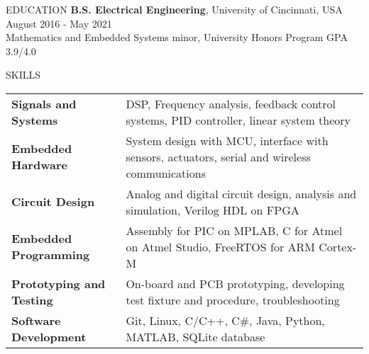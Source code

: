 \documentclass{../lib/resume} %
\begin{document}

\begin{rSection}{EDUCATION}
    {\bf B.S. Electrical Engineering}, University of Cincinnati, USA \hfill {August 2016 - May 2021}\\
    Mathematics and Embedded Systems minor, University Honors Program \hfill {GPA 3.9/4.0}




\end{rSection}

\begin{rSection}{SKILLS}

    \begin{tabular}{ @{} >{\bfseries}l @{\hspace{2ex}} l }
        Signals and Systems     & DSP, Frequency analysis, feedback control systems, PID controller, linear system theory       \\
        Embedded Hardware       & System design with MCU, interface with sensors, actuators, serial and wireless communications \\
        Circuit Design          & Analog and digital circuit design, analysis and simulation, Verilog HDL on FPGA               \\
        Embedded Programming    & Assembly for PIC on MPLAB, C for Atmel on Atmel Studio, FreeRTOS for ARM Cortex-M                   \\
        Prototyping and Testing & On-board and PCB prototyping, developing test fixture and procedure, troubleshooting          \\
        Software Development    & Git, Linux, C/C++, C\#, Java, Python, MATLAB, SQLite database                                             \\
    \end{tabular}
\end{rSection}
\end{document}

